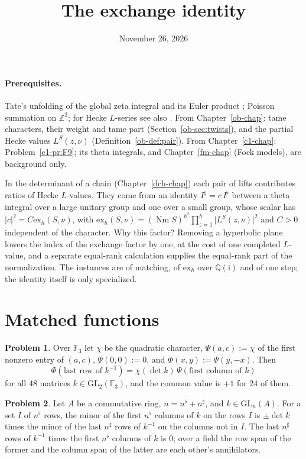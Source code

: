 \documentclass[reqno]{amsart}
\title{The exchange identity}
\author{}
\date{November 26, 2026}
\newcounter{chap}
\theoremstyle{definition}
\newtheorem{problem}{Problem}[section]
\theoremstyle{plain}
\newcommand{\Z}{\mathbb Z}
\newcommand{\Q}{\mathbb Q}
\newcommand{\F}{\mathbb F}
\newcommand{\Nm}{\operatorname{Nm}}
\newcommand{\ex}{\mathrm{ex}}
\newcommand{\GL}{\mathrm{GL}}
\newcommand{\ns}{n^\sharp}
\newcommand{\nb}{n^\flat}
\newcommand{\ii}{\mathrm{i}}
\begin{document}
\maketitle
{}\label{chap}

\paragraph{Prerequisites.}
Tate's unfolding of the global zeta integral and its Euler product \cite[Ch.~XV, \S\S4.4--4.5]{CF}; Poisson summation on \(\Z^2\); for Hecke \(L\)-series see also \cite[Ch.~VII, \S8]{Neu}.  From Chapter~\ref{ob-chap}: tame characters, their weight and tame part (Section~\ref{ob-sec:twists}), and the partial Hecke values \(L^S(z,\nu)\) (Definition~\ref{ob-def:pair}).  From Chapter~\ref{c1-chap}: Problem~\ref{c1-pr:F9}; its theta integrals, and Chapter~\ref{fm-chap} (Fock models), are background only.

\medskip
In the determinant of a chain (Chapter~\ref{dch-chap}) each pair of lifts contributes ratios of Hecke \(L\)-values.  They come from an identity \(I^\sharp = c\,I^\flat\) between a theta integral over a large unitary group and one over a small group, whose scalar has \(\lvert c\rvert^2 = C\ex_h(S,\nu)\), with \(\ex_h(S,\nu) = (\Nm S)^{h^2}\prod_{z=1}^h\lvert L^S(z,\nu)\rvert^2\) and \(C > 0\) independent of the character.  Why this factor?  Removing a hyperbolic plane lowers the index of the exchange factor by one, at the cost of one completed \(L\)-value, and a separate equal-rank calculation supplies the equal-rank part of the normalization.  The instances are of matching, of \(\ex_h\) over \(\Q(\ii)\) and of one step; the identity itself is only specialized.

\section{Matched functions}\label{sec:matched}

\begin{problem}\label{pr:matched-F3}
Over \(\F_3\) let \(\chi\) be the quadratic character, \(\Psi(a,c) := \chi\) of the first nonzero entry of \((a,c)\), \(\Psi(0,0) := 0\), and \(\Phi(x,y) := \Psi(y,-x)\).  Then
\[
  \Phi(\text{last row of } k^{-1}) = \chi(\det k)\, \Psi(\text{first column of } k)
\]
for all \(48\) matrices \(k \in \GL_2(\F_3)\), and the common value is \(+1\) for \(24\) of them.
\end{problem}

\begin{problem}\label{pr:minors}
Let \(A\) be a commutative ring, \(n = \nb + \ns\), and \(k \in \GL_n(A)\).  For a set \(I\) of \(\nb\) rows, the minor of the first \(\nb\) columns of \(k\) on the rows \(I\) is \(\pm\det k\) times the minor of the last \(\ns\) rows of \(k^{-1}\) on the columns not in \(I\).  The last \(\ns\) rows of \(k^{-1}\) times the first \(\nb\) columns of \(k\) is \(0\); over a field the row span of the former and the column span of the latter are each other's annihilators.
\end{problem}
\end{document}
